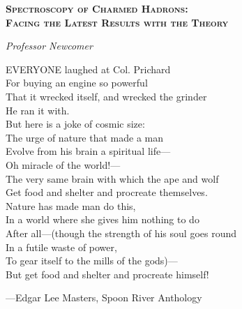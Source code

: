 \thispagestyle{empty}

\begin{center}
{\huge 
  \textsc{ \bfseries Spectroscopy of Charmed Hadrons:\\ Facing the Latest Results with the Theory} \par
}
\HRule
\end{center}

\cleardoublepage

\thispagestyle{empty}

\vspace{0.2\textheight}
\begin{flushright}
\begin{minipage}[t]{0.6\textwidth}
{\em
Professor Newcomer \newline

EVERYONE laughed at Col. Prichard \\
For buying an engine so powerful \\
That it wrecked itself, and wrecked the grinder \\
He ran it with. \\
But here is a joke of cosmic size: \\
The urge of nature that made a man \\
Evolve from his brain a spiritual life— \\
Oh miracle of the world!— \\
The very same brain with which the ape and wolf \\
Get food and shelter and procreate themselves. \\
Nature has made man do this, \\
In a world where she gives him nothing to do \\
After all—(though the strength of his soul goes round \\
In a futile waste of power, \\
To gear itself to the mills of the gods)— \\
But get food and shelter and procreate himself! \\
}
\begin{flushright}
---Edgar Lee Masters, Spoon River Anthology
\end{flushright}
\end{minipage}
\end{flushright}
